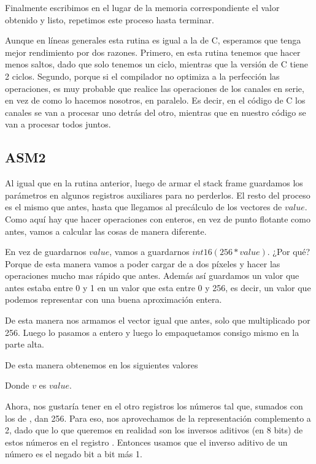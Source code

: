Finalmente escribimos en el lugar de la memoria correspondiente el valor obtenido y listo, repetimos este proceso hasta terminar.

Aunque en líneas generales esta rutina es igual a la de C, esperamos que tenga mejor rendimiento por dos razones.
Primero, en esta rutina tenemos que hacer menos saltos, dado que solo tenemos un ciclo, mientras que la versión de C tiene 2 ciclos.
Segundo, porque si el compilador no optimiza a la perfección las operaciones, es muy probable que realice las operaciones de los canales en serie, en vez de como lo hacemos nosotros, en paralelo.
Es decir, en el código de C los canales se van a procesar uno detrás del otro, mientras que en nuestro código se van a procesar todos juntos.


\subsection{ASM2}

Al igual que en la rutina anterior, luego de armar el stack frame guardamos los parámetros en algunos registros auxiliares para no perderlos. El resto del proceso es el mismo que antes, hasta que llegamos al precálculo de los vectores de $value$. Como aquí hay que hacer operaciones con enteros, en vez de punto flotante como antes, vamos a calcular las cosas de manera diferente.

En vez de guardarnos $value$, vamos a guardarnos $int16(256*value)$. ¿Por qué? Porque de esta manera vamos a poder cargar de a dos píxeles y hacer las operaciones mucho mas rápido que antes. Además así guardamos un valor que antes estaba entre 0 y 1 en un valor que esta entre 0 y 256, es decir, un valor que podemos representar con una buena aproximación entera.

De esta manera nos armamos el vector igual que antes, solo que multiplicado por 256. Luego lo pasamos a entero y luego lo empaquetamos consigo mismo en la parte alta.

De esta manera obtenemos en  los siguientes valores


Donde $v$ es $value$.


Ahora, nos gustaría tener en el otro registros los números tal que, sumados con los de , dan 256. Para eso, nos aprovechamos de la representación complemento a 2, dado que lo que queremos en realidad son los inversos aditivos (en 8 bits) de estos números en el registro . Entonces usamos que el inverso aditivo de un número es el negado bit a bit más 1.

